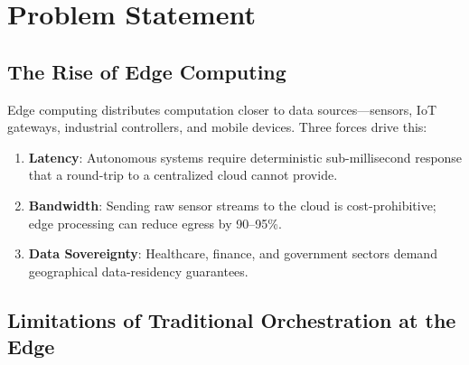 \documentclass[11pt,a4paper]{article}
\begin{document}
\begin{abstract}
\vspace{0.5em}
\noindent\textbf{System Resources \& Availability:}
The complete source code and technical implementation details are available in the official 
\href{https://github.com/lakshyajain-0291/mini-k8ts}{GitHub Repository}. A comprehensive 
\href{https://youtu.be/dQw4w9WgXcQ}{Project Demonstration Video} is also available, 
documenting the system's resilience under large-scale node failure scenarios.
\end{abstract}

\newpage
\tableofcontents
\newpage

\section{Problem Statement}

\subsection{The Rise of Edge Computing}

Edge computing distributes computation closer to data sources---sensors, IoT gateways,
industrial controllers, and mobile devices. Three forces drive this:

\begin{enumerate}[label=\textbf{\arabic*.}, leftmargin=2em]
  \item \textbf{Latency}: Autonomous systems require deterministic sub-millisecond response
        that a round-trip to a centralized cloud cannot provide.
  \item \textbf{Bandwidth}: Sending raw sensor streams to the cloud is cost-prohibitive;
        edge processing can reduce egress by 90--95\%.
  \item \textbf{Data Sovereignty}: Healthcare, finance, and government sectors demand
        geographical data-residency guarantees.
\end{enumerate}

\subsection{Limitations of Traditional Orchestration at the Edge}
\end{document}
